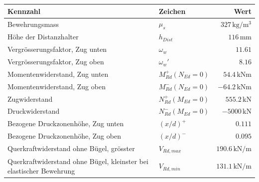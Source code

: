 \documentclass[11pt,a4paper]{article}
\begin{document}
\begin{longtable}{llr}
\hline
Kennzahl & Zeichen & Wert \\
\hline
\endhead
Bewehrungsmass & $\mu_s$ & $327\,\mathrm{kg}/\mathrm{m}^{3}$ \\
Höhe der Distanzhalter & $h_{Dist}$ & $116\,\mathrm{mm}$ \\
Vergrösserungsfaktor, Zug unten & $\omega_w$ & $11.61$ \\
Vergrösserungsfaktor, Zug oben & $\omega_w'$ & $8.16$ \\
Momentenwiderstand, Zug unten & $M_{Rd}^{+}(N_{Ed} = 0)$ & $54.4\,\mathrm{kNm}$ \\
Momentenwiderstand, Zug oben & $M_{Rd}^{-}(N_{Ed} = 0)$ & $-64.2\,\mathrm{kNm}$ \\
Zugwiderstand & $N_{Rd}^{+}(M_{Ed} = 0)$ & $555.2\,\mathrm{kN}$ \\
Druckwiderstand & $N_{Rd}^{-}(M_{Ed} = 0)$ & $-5000\,\mathrm{kN}$ \\
Bezogene Druckzonenhöhe, Zug unten & $\left(x/d\right)^{+}$ & $0.111$ \\
Bezogene Druckzonenhöhe, Zug oben & $\left(x/d\right)^{-}$ & $0.095$ \\
Querkraftwiderstand ohne Bügel, grösster & $V_{Rd,max}$ & $190.6\,\mathrm{kN}/\mathrm{m}$ \\
Querkraftwiderstand ohne Bügel, kleinster bei elastischer Bewehrung & $V_{Rd,min}$ & $131.1\,\mathrm{kN}/\mathrm{m}$ \\
\hline
\end{longtable}
\end{document}
